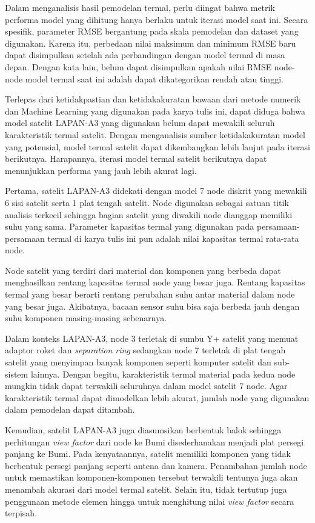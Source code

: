 Dalam menganalisis hasil pemodelan termal, perlu diingat bahwa metrik
performa model yang dihitung hanya berlaku untuk iterasi model saat ini. Secara
spesifik, parameter RMSE bergantung pada skala pemodelan dan dataset yang
digunakan. Karena itu, perbedaan nilai maksimum dan minimum RMSE baru dapat
disimpulkan setelah ada perbandingan dengan model termal di masa depan. Dengan
kata lain, belum dapat disimpulkan apakah nilai RMSE node-node model termal
saat ini adalah dapat dikategorikan rendah atau tinggi.

Terlepas dari ketidakpastian dan ketidakakuratan bawaan dari metode numerik dan Machine
Learning yang digunakan pada karya tulis ini, dapat diduga bahwa model satelit LAPAN-A3 yang
digunakan belum dapat mewakili seluruh karakteristik termal satelit. Dengan
menganalisis sumber ketidakakuratan model yang potensial, model termal satelit
dapat dikembangkan lebih lanjut pada iterasi berikutnya. Harapannya, iterasi
model termal satelit berikutnya dapat menunjukkan performa yang jauh lebih
akurat lagi.

Pertama, satelit LAPAN-A3 didekati dengan model 7 node diskrit yang
mewakili 6 sisi satelit serta 1 plat tengah satelit. Node digunakan sebagai
satuan titik analisis terkecil sehingga bagian satelit yang diwakili node
dianggap memiliki suhu yang sama. Parameter kapasitas termal yang digunakan
pada persamaan-persamaan termal di karya tulis ini pun adalah nilai kapasitas
termal rata-rata node. 

Node satelit yang terdiri dari material dan komponen yang berbeda dapat
menghasilkan rentang kapasitas termal node yang besar juga. Rentang kapasitas
termal yang besar berarti rentang perubahan suhu antar material dalam node yang
besar juga. Akibatnya, bacaan sensor suhu bisa saja berbeda jauh dengan suhu
komponen masing-masing sebenarnya.

Dalam konteks LAPAN-A3, node 3 terletak di sumbu Y+ satelit yang memuat adaptor
roket dan \textit{separation ring} sedangkan node 7 terletak di plat tengah
satelit yang menyimpan banyak komponen seperti komputer satelit dan sub-sistem
lainnya. Dengan begitu, karakteristik termal material pada kedua node mungkin
tidak dapat terwakili seluruhnya dalam model satelit 7 node. Agar karakteristik
termal dapat dimodelkan lebih akurat, jumlah node yang digunakan dalam
pemodelan dapat ditambah.

Kemudian, satelit LAPAN-A3 juga diasumsikan berbentuk balok sehingga
perhitungan \textit{view factor} dari node ke Bumi disederhanakan menjadi plat
persegi panjang ke Bumi. Pada kenyataannya, satelit memiliki komponen yang
tidak berbentuk persegi panjang seperti antena dan kamera. Penambahan jumlah
node untuk memastikan komponen-komponen tersebut terwakili tentunya juga akan
menambah akurasi dari model termal satelit. Selain itu, tidak tertutup juga
penggunaan metode elemen hingga untuk menghitung nilai \textit{view factor}
secara terpisah.

